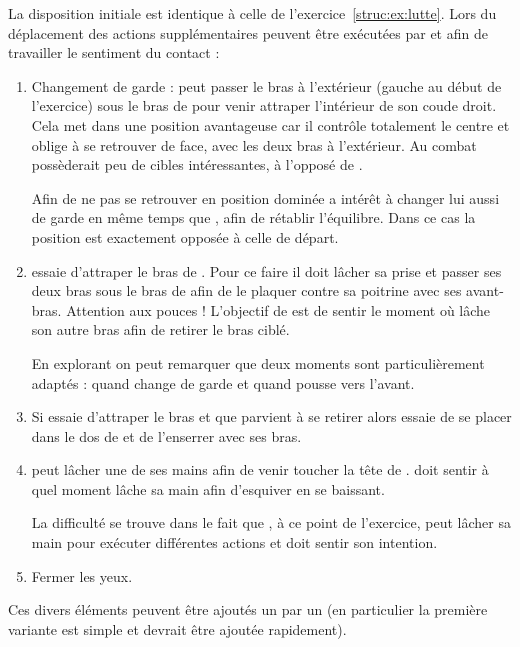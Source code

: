 \begin{exercice}
	\label{att:ex:lutte-variantes}
	
	

	La disposition initiale est identique à celle de l'exercice~\ref{struc:ex:lutte}.
	Lors du déplacement des actions supplémentaires peuvent être exécutées par \A et \D afin de travailler le sentiment du contact :
	\begin{enumerate}
		\item Changement de garde : \A peut passer le bras à l'extérieur (gauche au début de l'exercice) sous le bras de \D pour venir attraper l'intérieur de son coude droit.
		Cela met \A dans une position avantageuse car il contrôle totalement le centre et oblige \D à se retrouver de face, avec les deux bras à l'extérieur.
		Au combat \D possèderait peu de cibles intéressantes, à l'opposé de \A.
		
		Afin de ne pas se retrouver en position dominée \D a intérêt à changer lui aussi de garde en même temps que \A, afin de rétablir l'équilibre.
		Dans ce cas la position est exactement opposée à celle de départ.
		
		\item \A essaie d'attraper le bras de \D.
		Pour ce faire il doit lâcher sa prise et passer ses deux bras sous le bras de \D afin de le plaquer contre sa poitrine avec ses avant-bras.
		Attention aux pouces !
		L'objectif de \D est de sentir le moment où \A lâche son autre bras afin de retirer le bras ciblé.
		
		En explorant on peut remarquer que deux moments sont particulièrement adaptés : quand \D change de garde et quand \D pousse vers l'avant.
		
		\item Si \A essaie d'attraper le bras et que \D parvient à se retirer alors \D essaie de se placer dans le dos de \A et de l'enserrer avec ses bras.
		
		\item \A peut lâcher une de ses mains afin de venir toucher la tête de \D.
		\D doit sentir à quel moment \A lâche sa main afin d'esquiver en se baissant.
		
		La difficulté se trouve dans le fait que \A, à ce point de l'exercice, \A peut lâcher sa main pour exécuter différentes actions et \D doit sentir son intention.
		
		\item Fermer les yeux.
	\end{enumerate}
	Ces divers éléments peuvent être ajoutés un par un (en particulier la première variante est simple et devrait être ajoutée rapidement).

\end{exercice}


